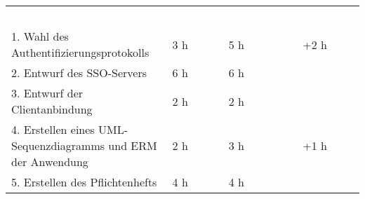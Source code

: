 \begin{tabularx}{\textwidth}{Xlll}
\rowcolor{heading}\textcolor{white}{\textbf{Vorgang}} & \textcolor{white}{\textbf{Geplant}} & \textcolor{white}{\textbf{Tatsächlich}} & \textcolor{white}{\textbf{Differenz}} \\
1. Wahl des Authentifizierungsprotokolls & 3 h   & 5 h   & +2 h  \\
\rowcolor{odd}2. Entwurf des SSO-Servers  & 6 h   & 6 h   &  \\
3. Entwurf der Clientanbindung & 2 h   & 2 h   &  \\
\rowcolor{odd}4. Erstellen eines UML-Sequenzdiagramms und ERM der Anwendung & 2 h   & 3 h  & +1 h  \\
5. Erstellen des Pflichtenhefts & 4 h   & 4 h   &  \\
\end{tabularx}

